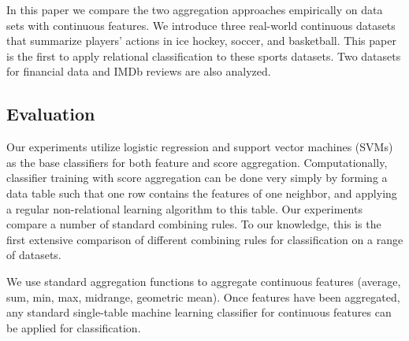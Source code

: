 \documentclass[conference]{IEEEtran}
\begin{document}
%
In this paper we compare the two aggregation approaches empirically on data sets with continuous features. We introduce three real-world continuous datasets that summarize players' actions in ice hockey, soccer, and basketball. This paper is the first to apply relational classification to these sports datasets.
Two datasets for financial data and IMDb reviews are also analyzed.


\subsection{Evaluation}
Our experiments utilize logistic regression and support vector machines (SVMs) as the base classifiers for both feature and score aggregation.
Computationally, classifier training with score aggregation can be done very simply by forming a data table such that one row contains the features of one neighbor, and applying a regular non-relational learning algorithm to this table. Our experiments compare a number of standard combining rules. To our knowledge, this is the first extensive comparison of different combining rules for classification on a range of datasets.

We use standard aggregation functions to aggregate continuous features (average, sum, min, max, midrange, geometric mean). Once features have been aggregated, any standard single-table machine learning classifier for continuous features can be applied for classification.


\end{document}
